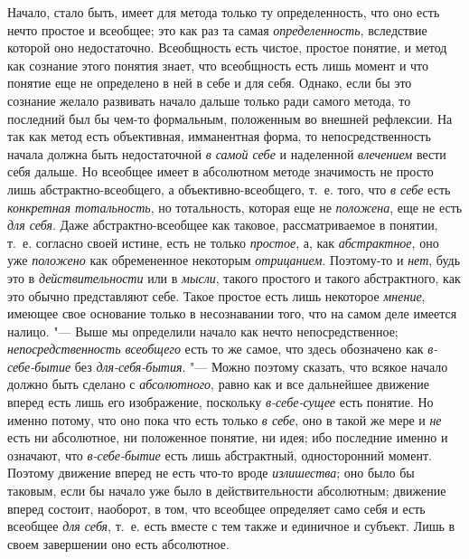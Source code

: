 {{Начало, стало быть, имеет для метода только ту определенность, что оно
есть нечто простое и всеобщее; это как раз та самая {\em определенность},
вследствие которой оно недостаточно. Всеобщность есть чистое,
простое понятие, и метод как сознание этого понятия знает, что всеобщность
есть лишь момент и что понятие еще не определено в ней в себе и для себя.
Однако, если бы это сознание желало развивать начало дальше только ради
самого метода, то последний был бы чем-то формальным, положенным во внешней
рефлексии. На так как метод есть объективная, имманентная форма, то
непосредственность начала должна быть недостаточной
{\em в самой себе} и наделенной {\em влечением}
вести себя дальше. Но всеобщее имеет в абсолютном методе
значимость не просто лишь абстрактно-всеобщего, а объективно-всеобщего,
т.~е. того, что {\em в себе} есть {\em конкретная
тотальность}, но тотальность, которая еще не
{\em положена}, еще не есть {\em для себя}. Даже
абстрактно-всеобщее как таковое, рассматриваемое в понятии, т.~е. согласно
своей истине, есть не только {\em простое}, а, как {\em абстрактное}, оно
уже {\em положено} как обремененное некоторым {\em отрицанием}.
Поэтому-то и {\em нет}, будь это в {\em действительности} или в {\em мысли},
такого простого и такого абстрактного, как это обычно
представляют себе. Такое простое есть лишь некоторое {\em мнение}, имеющее
свое основание только в несознавании того, что на самом деле имеется
налицо. "--- Выше мы определили начало как нечто непосредственное;
{\em непосредственность всеобщего}
есть то же самое, что здесь обозначено как
{\em в-себе-бытие} без {\em для-себя-бытия}. "--- Можно поэтому
сказать, что всякое начало должно быть сделано с {\em абсолютного},
равно как и все дальнейшее движение вперед есть лишь его
изображение, поскольку {\em в-себе-сущее} есть
понятие. Но именно потому, что оно пока что есть только
{\em в себе}, оно в такой же мере и {\em не} есть
ни абсолютное, ни положенное понятие, ни идея; ибо последние именно и
означают, что {\em в-себе-бытие}
есть лишь абстрактный, односторонний момент. Поэтому движение
вперед не есть что-то вроде {\em излишества}; оно
было бы таковым, если бы начало уже было в действительности абсолютным;
движение вперед состоит, наоборот, в том, что всеобщее определяет само себя
и есть всеобщее {\em для себя},
т.~е. есть вместе с тем также и единичное и субъект. Лишь в
своем завершении оно есть абсолютное.

}}
